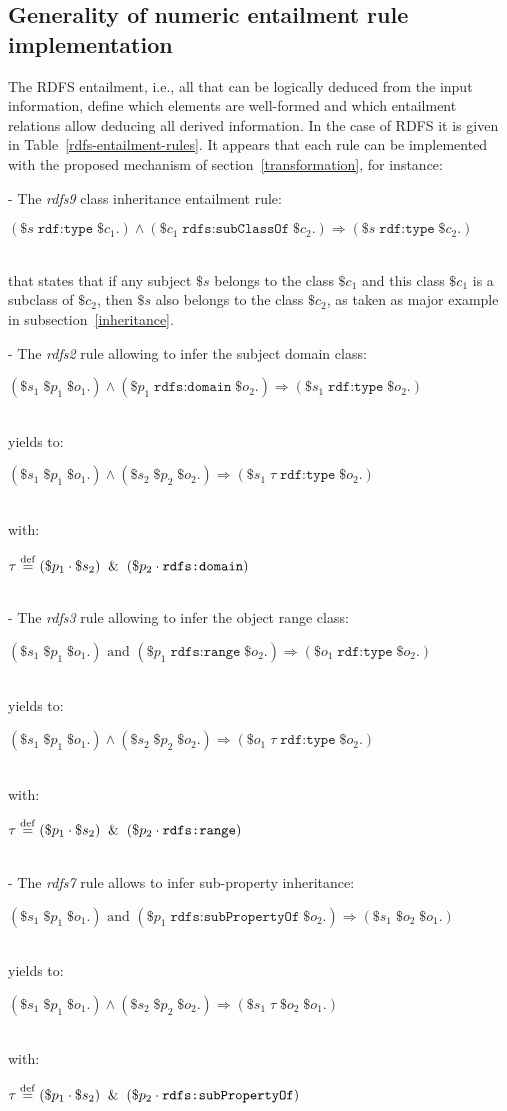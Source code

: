 \documentclass[sn-mathphys]{sn-jnl}
\newcommand{\defq}{\stackrel {\rm def}{=}}
\newcommand{\eqline}[1]{~\vspace{0.1cm}\\\centerline{$#1$}\vspace{0.1cm}\\}
\begin{document}
\begin{appendices}
\subsection*{Generality of numeric entailment rule implementation} \label{RDFS-entailment-rules-2}

The RDFS entailment, i.e., all that can be logically deduced from the input information, define which elements are well-formed and which entailment relations allow deducing all derived information. In the case of RDFS it is given in Table~\ref{rdfs-entailment-rules}. It appears that each rule can be implemented with the proposed mechanism of section~\ref{transformation}, for instance:

- The \textit{rdfs9}  class inheritance entailment rule:
\eqline{(\$s \; \texttt{rdf:type} \; \$c_1 .) \wedge (\$c_1 \; \texttt{rdfs:subClassOf} \; \$c_2 .) \Rightarrow (\$s \; \texttt{rdf:type} \; \$c_2 .)}
that states that if any subject $\$s$ belongs to the class $\$c_1$ and this class $\$c_1$ is a subclass of $\$c_2$, then $\$s$ also belongs to the class $\$c_2$, as taken as major example in subsection~\ref{inheritance}.

- The \textit{rdfs2} rule allowing to infer the subject domain class:
\eqline{(\$s_1 \; \$p_1 \; \$o_1 .) \wedge (\$p_1 \; \texttt{rdfs:domain} \; \$o_2 .) \Rightarrow (\$s_1 \; \texttt{rdf:type} \; \$o_2 .)}
yields to:
\eqline{(\$s_1 \; \$p_1 \; \$o_1 .) \wedge (\$s_2 \; \$p_2 \; \$o_2 .) \Rightarrow (\$s_1 \; \tau \; \texttt{rdf:type} \; \$o_2 .)}
with:
\eqline{\tau \defq (\$p_1 \cdot \$s_2) \And (\$p_2 \cdot \texttt{rdfs:domain})}

- The \textit{rdfs3} rule allowing to infer the object range class:
\eqline{(\$s_1 \; \$p_1 \; \$o_1 .) \mbox{ and } (\$p_1 \; \texttt{rdfs:range} \; \$o_2 .) \Rightarrow (\$o_1 \; \texttt{rdf:type} \; \$o_2 .)}
yields to:
\eqline{(\$s_1 \; \$p_1 \; \$o_1 .) \wedge (\$s_2 \; \$p_2 \; \$o_2 .) \Rightarrow (\$o_1 \; \tau \; \texttt{rdf:type} \; \$o_2 .)}
with:
\eqline{\tau \defq (\$p_1 \cdot \$s_2) \And (\$p_2 \cdot \texttt{rdfs:range})}

- The \textit{rdfs7} rule allows to infer sub-property inheritance:
\eqline{(\$s_1 \; \$p_1 \; \$o_1 .) \mbox{ and } (\$p_1 \; \texttt{rdfs:subPropertyOf} \; \$o_2 .) \Rightarrow (\$s_1 \; \$o_2 \; \$o_1 .)}
yields to:
\eqline{(\$s_1 \; \$p_1 \; \$o_1 .) \wedge (\$s_2 \; \$p_2 \; \$o_2 .) \Rightarrow (\$s_1 \; \tau \; \$o_2 \; \$o_1 .)}
with:
\eqline{\tau \defq (\$p_1 \cdot \$s_2) \And (\$p_2 \cdot \texttt{rdfs:subPropertyOf})}


\end{appendices}
\end{document}
